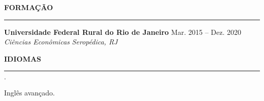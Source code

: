 \documentclass[12pt]{article}
\newenvironment{tightlist}
  {\begin{list}
    {$\cdot$}
    {
      \setlength{\leftmargin}{0em}
      \setlength{\itemsep}{-\smallskipamount}
    }
  }
{\end{list}}
\begin{document}
\medskip \textbf{FORMAÇÃO} \medskip
\hrule

\textbf{Universidade Federal Rural do Rio de Janeiro} \hfill {Mar. 2015 -- Dez. 2020} \\
\textit{Ciências Econômicas} \hfill \textit{Seropédica, RJ} {\parfillskip=0pt\par}

\medskip \textbf{IDIOMAS} \medskip
\hrule

\begin{tightlist}
  \item Inglês avançado.
\end{tightlist}
\end{document}
